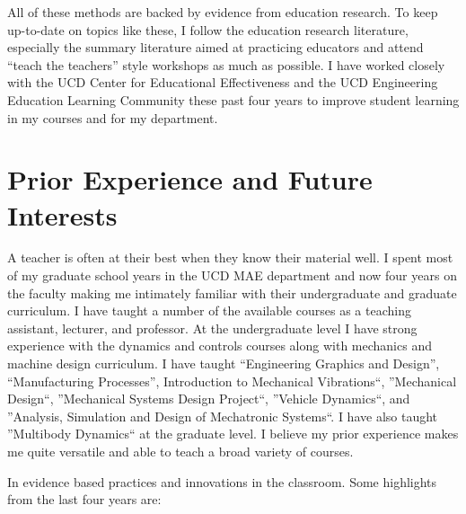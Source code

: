 \documentclass{article}
\begin{document}
All of these methods are backed by evidence from education research. To keep
up-to-date on topics like these, I follow the education research literature,
especially the summary literature aimed at practicing educators and attend
``teach the teachers'' style workshops as much as possible. I have worked
closely with the UCD Center for Educational Effectiveness and the UCD
Engineering Education Learning Community these past four years to improve
student learning in my courses and for my department.

\section*{Prior Experience and Future Interests}
%
A teacher is often at their best when they know their material well. I spent
most of my graduate school years in the UCD MAE department and now four years
on the faculty making me intimately familiar with their undergraduate and
graduate curriculum. I have taught a number of the available courses as a
teaching assistant, lecturer, and professor. At the undergraduate level I have
strong experience with the dynamics and controls courses along with mechanics
and machine design curriculum. I have taught ``Engineering Graphics and
Design'', ``Manufacturing Processes'', Introduction to Mechanical Vibrations``,
''Mechanical Design``, ''Mechanical Systems Design Project``, ''Vehicle
Dynamics``, and ''Analysis, Simulation and Design of Mechatronic Systems``. I
have also taught ''Multibody Dynamics`` at the graduate level. I believe my
prior experience makes me quite versatile and able to teach a broad variety of
courses.

In evidence based practices and innovations in the classroom. Some highlights
from the last four years are:
\end{document}
